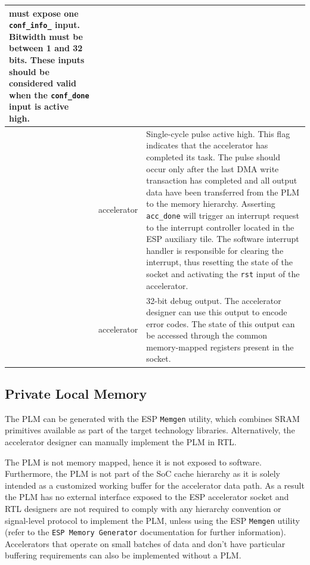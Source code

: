 \begin{table}[h!]
\begin{tabular}{|p{2.25in} p{0.75in}| p{3.25in} |}
                                           must expose one \texttt{conf\_info\_}
                                           input. Bitwidth must be between 1 and
                                           32 bits. These inputs should be
                                           considered valid when the
                                           \texttt{conf\_done} input is active
                                           high. \\
\hline
  \verb acc_done  & accelerator & Single-cycle pulse active high. This flag
                                  indicates that the accelerator has completed
                                  its task. The pulse should occur only after
                                  the last DMA write transaction has completed
                                  and all output data have been transferred from
                                  the PLM to the memory hierarchy. Asserting
                                  \texttt{acc\_done} will trigger an interrupt
                                  request to the interrupt controller located
                                  in the ESP auxiliary tile. The software
                                  interrupt handler is responsible for clearing
                                  the interrupt, thus resetting the state of the
                                  socket and activating the \texttt{rst} input
                                  of the accelerator. \\
\hline
  \verb debug  & accelerator & 32-bit debug output. The accelerator designer can
                               use this output to encode error codes. The state
                               of this output can be accessed through the common
                               memory-mapped registers present in the socket. \\
\hline
\end{tabular}
\end{table}

\subsection{Private Local Memory}
The PLM can be generated with the ESP \texttt{Memgen} utility, which combines
SRAM primitives available as part of the target technology libraries.
Alternatively, the accelerator designer can manually implement the PLM in RTL.

The PLM is not memory mapped, hence it is not exposed to software. Furthermore,
the PLM is not part of the SoC cache hierarchy as it is solely intended as a
customized working buffer for the accelerator data path.
%
As a result the PLM has no external interface exposed to the ESP accelerator
socket and RTL designers are not required to comply with any hierarchy
convention or signal-level protocol to implement the PLM, unless using the ESP
\texttt{Memgen} utility (refer to the \texttt{ESP Memory Generator}
documentation for further information).
Accelerators that operate on small batches of data and don't have particular
buffering requirements can also be implemented without a PLM.

